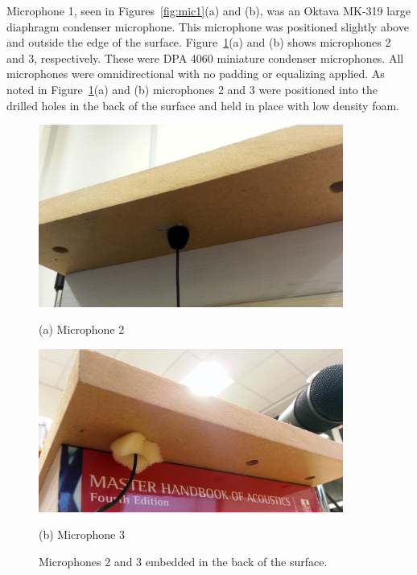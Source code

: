Microphone 1, seen in Figures~\ref{fig:mic1}(a) and (b), was an Oktava MK-319 large diaphragm condenser microphone. This microphone was positioned slightly above and outside the edge of the surface. Figure~\ref{fig:mic23}(a) and (b) shows microphones 2 and 3, respectively. These were DPA 4060 miniature condenser microphones. All microphones were omnidirectional with no padding or equalizing applied. As noted in Figure~\ref{fig:mic23}(a) and (b) microphones 2 and 3 were positioned into the drilled holes in the back of the surface and held in place with low density foam.

\begin{figure}
\begin{minipage}[b]{1.0\linewidth}
  \centering
  \centerline{\includegraphics[width=10cm]{mic2}}
  \centerline{(a) Microphone 2}\medskip
\end{minipage}
\begin{minipage}[b]{1.0\linewidth}
  \centering
  \centerline{\includegraphics[width=10cm]{mic3}}
  \centerline{(b) Microphone 3}\medskip
\end{minipage}
\caption{Microphones 2 and 3 embedded in the back of the surface.}
\label{fig:mic23}
\end{figure}


